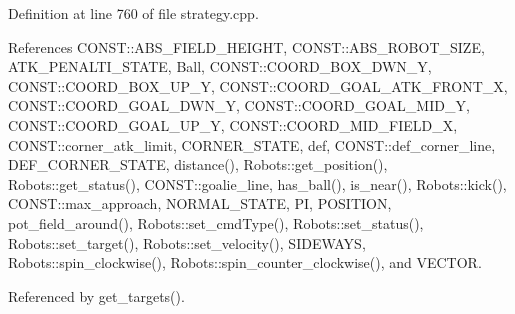 Definition at line 760 of file strategy.\+cpp.



References C\+O\+N\+S\+T\+::\+A\+B\+S\+\_\+\+F\+I\+E\+L\+D\+\_\+\+H\+E\+I\+G\+HT, C\+O\+N\+S\+T\+::\+A\+B\+S\+\_\+\+R\+O\+B\+O\+T\+\_\+\+S\+I\+ZE, A\+T\+K\+\_\+\+P\+E\+N\+A\+L\+T\+I\+\_\+\+S\+T\+A\+TE, Ball, C\+O\+N\+S\+T\+::\+C\+O\+O\+R\+D\+\_\+\+B\+O\+X\+\_\+\+D\+W\+N\+\_\+Y, C\+O\+N\+S\+T\+::\+C\+O\+O\+R\+D\+\_\+\+B\+O\+X\+\_\+\+U\+P\+\_\+Y, C\+O\+N\+S\+T\+::\+C\+O\+O\+R\+D\+\_\+\+G\+O\+A\+L\+\_\+\+A\+T\+K\+\_\+\+F\+R\+O\+N\+T\+\_\+X, C\+O\+N\+S\+T\+::\+C\+O\+O\+R\+D\+\_\+\+G\+O\+A\+L\+\_\+\+D\+W\+N\+\_\+Y, C\+O\+N\+S\+T\+::\+C\+O\+O\+R\+D\+\_\+\+G\+O\+A\+L\+\_\+\+M\+I\+D\+\_\+Y, C\+O\+N\+S\+T\+::\+C\+O\+O\+R\+D\+\_\+\+G\+O\+A\+L\+\_\+\+U\+P\+\_\+Y, C\+O\+N\+S\+T\+::\+C\+O\+O\+R\+D\+\_\+\+M\+I\+D\+\_\+\+F\+I\+E\+L\+D\+\_\+X, C\+O\+N\+S\+T\+::corner\+\_\+atk\+\_\+limit, C\+O\+R\+N\+E\+R\+\_\+\+S\+T\+A\+TE, def, C\+O\+N\+S\+T\+::def\+\_\+corner\+\_\+line, D\+E\+F\+\_\+\+C\+O\+R\+N\+E\+R\+\_\+\+S\+T\+A\+TE, distance(), Robots\+::get\+\_\+position(), Robots\+::get\+\_\+status(), C\+O\+N\+S\+T\+::goalie\+\_\+line, has\+\_\+ball(), is\+\_\+near(), Robots\+::kick(), C\+O\+N\+S\+T\+::max\+\_\+approach, N\+O\+R\+M\+A\+L\+\_\+\+S\+T\+A\+TE, PI, P\+O\+S\+I\+T\+I\+ON, pot\+\_\+field\+\_\+around(), Robots\+::set\+\_\+cmd\+Type(), Robots\+::set\+\_\+status(), Robots\+::set\+\_\+target(), Robots\+::set\+\_\+velocity(), S\+I\+D\+E\+W\+A\+YS, Robots\+::spin\+\_\+clockwise(), Robots\+::spin\+\_\+counter\+\_\+clockwise(), and V\+E\+C\+T\+OR.



Referenced by get\+\_\+targets().


